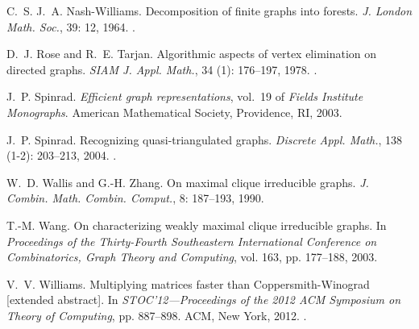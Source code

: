 \documentclass[a4paper,11pt]{article}
\begin{document}
\begin{thebibliography}{14}
C.~S. J.~A. Nash-Williams.
\newblock Decomposition of finite graphs into forests.
\newblock \emph{J. London Math. Soc.}, 39: 12, 1964.
\newblock {}.

D.~J. Rose and R.~E. Tarjan.
\newblock Algorithmic aspects of vertex elimination on directed graphs.
\newblock \emph{SIAM J. Appl. Math.}, 34 (1): 176--197, 1978.
\newblock {}.

J.~P. Spinrad.
\newblock \emph{Efficient graph representations}, vol.~19 of \emph{Fields
  Institute Monographs}.
\newblock American Mathematical Society, Providence, RI, 2003.

J.~P. Spinrad.
\newblock Recognizing quasi-triangulated graphs.
\newblock \emph{Discrete Appl. Math.}, 138 (1-2): 203--213,
  2004.
\newblock {}.

W.~D. Wallis and G.-H. Zhang.
\newblock On maximal clique irreducible graphs.
\newblock \emph{J. Combin. Math. Combin. Comput.}, 8: 187--193, 1990.

T.-M. Wang.
\newblock On characterizing weakly maximal clique irreducible graphs.
\newblock In \emph{Proceedings of the {T}hirty-{F}ourth {S}outheastern
  {I}nternational {C}onference on {C}ombinatorics, {G}raph {T}heory and
  {C}omputing}, vol. 163, pp. 177--188, 2003.

V.~V. Williams.
\newblock Multiplying matrices faster than {C}oppersmith-{W}inograd [extended
  abstract].
\newblock In \emph{S{TOC}'12---{P}roceedings of the 2012 {ACM} {S}ymposium on
  {T}heory of {C}omputing}, pp. 887--898. ACM, New York, 2012.
\newblock {}.

\end{thebibliography}
\end{document}
